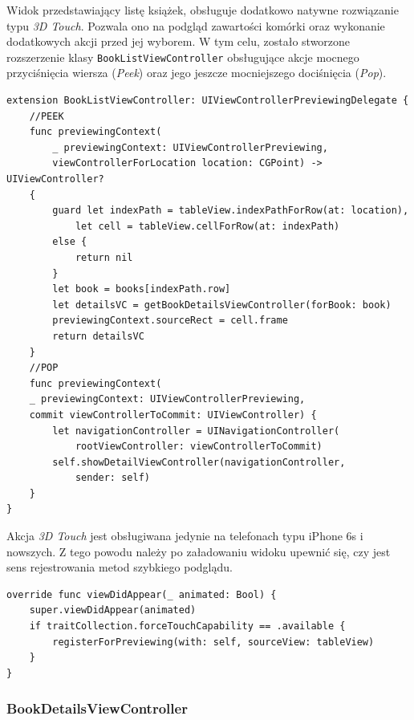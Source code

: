 \documentclass[twoside]{projektInzynierskiMS}
\begin{document}
Widok przedstawiający listę książek, obsługuje dodatkowo natywne rozwiązanie typu \textit{3D Touch}. Pozwala ono na podgląd zawartości komórki oraz wykonanie dodatkowych akcji przed jej wyborem. W tym celu, zostało stworzone rozszerzenie klasy \verb`BookListViewController` obsługujące akcje mocnego przyciśnięcia wiersza (\textit{Peek}) oraz jego jeszcze mocniejszego dociśnięcia (\textit{Pop}).

\begin{verbatim}
extension BookListViewController: UIViewControllerPreviewingDelegate {
    //PEEK
    func previewingContext(
        _ previewingContext: UIViewControllerPreviewing,
        viewControllerForLocation location: CGPoint) -> UIViewController?
    {
        guard let indexPath = tableView.indexPathForRow(at: location),
            let cell = tableView.cellForRow(at: indexPath)
        else {
            return nil
        }
        let book = books[indexPath.row]
        let detailsVC = getBookDetailsViewController(forBook: book)
        previewingContext.sourceRect = cell.frame
        return detailsVC
    }
    //POP
    func previewingContext(
    _ previewingContext: UIViewControllerPreviewing,
    commit viewControllerToCommit: UIViewController) {
        let navigationController = UINavigationController(
            rootViewController: viewControllerToCommit)
        self.showDetailViewController(navigationController,
            sender: self)
    }
}
\end{verbatim}
Akcja \textit{3D Touch} jest obsługiwana jedynie na telefonach typu iPhone 6s i nowszych. Z tego powodu należy po załadowaniu widoku upewnić się, czy jest sens rejestrowania metod szybkiego podglądu.
\begin{verbatim}
override func viewDidAppear(_ animated: Bool) {
    super.viewDidAppear(animated)
    if traitCollection.forceTouchCapability == .available {
        registerForPreviewing(with: self, sourceView: tableView)
    }
}
\end{verbatim}


\subsubsection{BookDetailsViewController}
\end{document}
